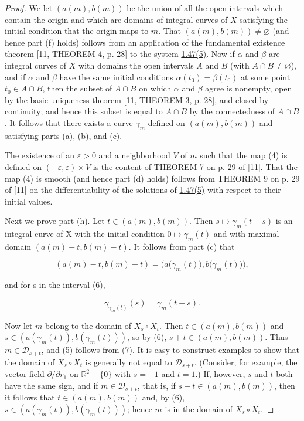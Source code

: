 \begin{proof}
	We let $(a(m),b(m))$ be the union of all the open intervals which contain the origin and which are domains of integral curves of $X$ satisfying the initial condition that the origin maps to $m$. That $(a(m),b(m)) \neq \varnothing$ (and hence part (f) holds) follows from an application of the fundamental existence theorem [11, THEOREM 4, p. 28] to the system \hyperref[thm:1.47]{1.47(5)}. Now if $\alpha$ and $\beta$ are integral curves of $X$ with domains the open intervals $A$ and $B$ (with $A \cap B \neq \varnothing$), and if $\alpha$ and $\beta$ have the same initial conditions $\alpha(t_0) = \beta(t_0)$ at some point $t_0 \in A \cap B$, then the subset of $A \cap B$ on which $\alpha$ and $\beta$ agree is nonempty, open by the basic uniqueness theorem [11, THEOREM 3, p. 28], and closed by continuity; and hence this subset is equal to $A \cap B$ by the connectedness of $A \cap B$. It follows that there exists a curve $\gamma_m$ defined on $(a(m), b(m))$ and satisfying parts (a), (b), and (c).

	The existence of an $\varepsilon>0$ and a neighborhood $V$ of $m$ such that the map (4) is defined on $(-\varepsilon,\varepsilon)\times V$ is the content of THEOREM 7 on p. 29 of [11]. That the map (4) is smooth (and hence part (d) holds) follows from THEOREM 9 on p. 29 of [11] on the differentiability of the solutions of \hyperref[thm:1.47]{1.47(5)} with respect to their initial values.

	Next we prove part (h). Let  $ t \in (a(m), b(m)) $. Then  $ s \mapsto \gamma_m(t + s) $ is an integral curve of X with the initial condition  $ 0 \mapsto \gamma_m(t) $ and with maximal domain  $ (a(m) - t, b(m) - t) $. It follows from part (c) that

	\begin{equation}
		\tag{6}\label{eq:1.48:6}
		(a(m)-t,b(m)-t)=\bigl(a\bigl(\gamma_{m}(t)\bigr),b\bigl(\gamma_{m}(t)\bigr)\bigr),
	\end{equation}

	and for s in the interval (6),

	\begin{equation}
		\tag{7}\label{eq:1.48:7}
		\gamma_{\gamma_{m}(t)}(s)=\gamma_{m}(t+s).
	\end{equation}

	Now let $m$ belong to the domain of $X_s \circ X_t$. Then $t \in (a(m), b(m))$ and $s \in (a(\gamma_m(t)), b(\gamma_m(t)))$, so by (6), $s + t \in (a(m), b(m))$. Thus $m \in \mathcal{D}_{s+t}$, and (5) follows from (7). It is easy to construct examples to show that the domain of $X_s \circ X_t$ is generally not equal to $\mathcal{D}_{s+t}$. (Consider, for example, the vector field $\partial/\partial r_1$ on $\mathbb{R}^{2} - \{0\}$ with $s = -1$ and $t = 1$.) If, however, $s$ and $t$ both have the same sign, and if $m \in \mathcal{D}_{s+t}$, that is, if $s + t \in (a(m), b(m))$, then it follows that $t \in (a(m), b(m))$ and, by (6), $s \in (a(\gamma_m(t)), b(\gamma_m(t)))$; hence $m$ is in the domain of $X_s \circ X_t$.


\end{proof}
